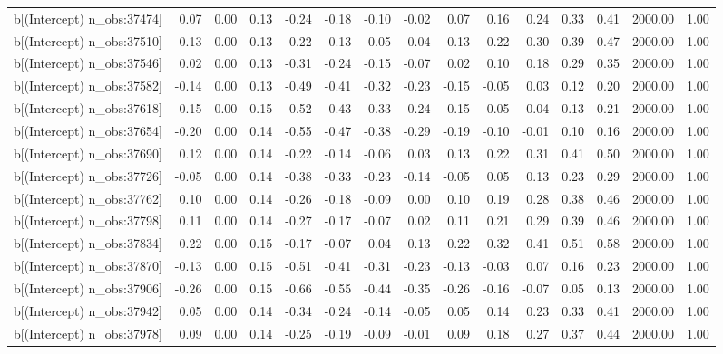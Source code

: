 \begin{table}[ht]
\begin{tabular}{rrrrrrrrrrrrrrr}
  b[(Intercept) n\_obs:37474] & 0.07 & 0.00 & 0.13 & -0.24 & -0.18 & -0.10 & -0.02 & 0.07 & 0.16 & 0.24 & 0.33 & 0.41 & 2000.00 & 1.00 \\ 
  b[(Intercept) n\_obs:37510] & 0.13 & 0.00 & 0.13 & -0.22 & -0.13 & -0.05 & 0.04 & 0.13 & 0.22 & 0.30 & 0.39 & 0.47 & 2000.00 & 1.00 \\ 
  b[(Intercept) n\_obs:37546] & 0.02 & 0.00 & 0.13 & -0.31 & -0.24 & -0.15 & -0.07 & 0.02 & 0.10 & 0.18 & 0.29 & 0.35 & 2000.00 & 1.00 \\ 
  b[(Intercept) n\_obs:37582] & -0.14 & 0.00 & 0.13 & -0.49 & -0.41 & -0.32 & -0.23 & -0.15 & -0.05 & 0.03 & 0.12 & 0.20 & 2000.00 & 1.00 \\ 
  b[(Intercept) n\_obs:37618] & -0.15 & 0.00 & 0.15 & -0.52 & -0.43 & -0.33 & -0.24 & -0.15 & -0.05 & 0.04 & 0.13 & 0.21 & 2000.00 & 1.00 \\ 
  b[(Intercept) n\_obs:37654] & -0.20 & 0.00 & 0.14 & -0.55 & -0.47 & -0.38 & -0.29 & -0.19 & -0.10 & -0.01 & 0.10 & 0.16 & 2000.00 & 1.00 \\ 
  b[(Intercept) n\_obs:37690] & 0.12 & 0.00 & 0.14 & -0.22 & -0.14 & -0.06 & 0.03 & 0.13 & 0.22 & 0.31 & 0.41 & 0.50 & 2000.00 & 1.00 \\ 
  b[(Intercept) n\_obs:37726] & -0.05 & 0.00 & 0.14 & -0.38 & -0.33 & -0.23 & -0.14 & -0.05 & 0.05 & 0.13 & 0.23 & 0.29 & 2000.00 & 1.00 \\ 
  b[(Intercept) n\_obs:37762] & 0.10 & 0.00 & 0.14 & -0.26 & -0.18 & -0.09 & 0.00 & 0.10 & 0.19 & 0.28 & 0.38 & 0.46 & 2000.00 & 1.00 \\ 
  b[(Intercept) n\_obs:37798] & 0.11 & 0.00 & 0.14 & -0.27 & -0.17 & -0.07 & 0.02 & 0.11 & 0.21 & 0.29 & 0.39 & 0.46 & 2000.00 & 1.00 \\ 
  b[(Intercept) n\_obs:37834] & 0.22 & 0.00 & 0.15 & -0.17 & -0.07 & 0.04 & 0.13 & 0.22 & 0.32 & 0.41 & 0.51 & 0.58 & 2000.00 & 1.00 \\ 
  b[(Intercept) n\_obs:37870] & -0.13 & 0.00 & 0.15 & -0.51 & -0.41 & -0.31 & -0.23 & -0.13 & -0.03 & 0.07 & 0.16 & 0.23 & 2000.00 & 1.00 \\ 
  b[(Intercept) n\_obs:37906] & -0.26 & 0.00 & 0.15 & -0.66 & -0.55 & -0.44 & -0.35 & -0.26 & -0.16 & -0.07 & 0.05 & 0.13 & 2000.00 & 1.00 \\ 
  b[(Intercept) n\_obs:37942] & 0.05 & 0.00 & 0.14 & -0.34 & -0.24 & -0.14 & -0.05 & 0.05 & 0.14 & 0.23 & 0.33 & 0.41 & 2000.00 & 1.00 \\ 
  b[(Intercept) n\_obs:37978] & 0.09 & 0.00 & 0.14 & -0.25 & -0.19 & -0.09 & -0.01 & 0.09 & 0.18 & 0.27 & 0.37 & 0.44 & 2000.00 & 1.00 \\ 

\end{tabular}
\end{table}
